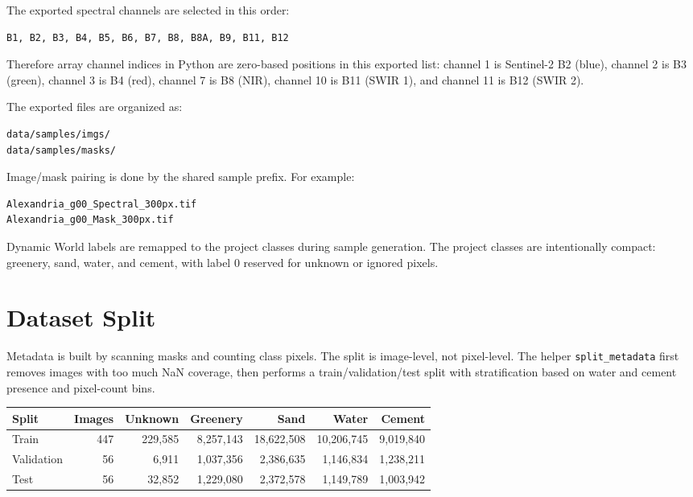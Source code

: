 \documentclass[11pt,a4paper]{article}
\begin{document}
The exported spectral channels are selected in this order:
\begin{verbatim}
B1, B2, B3, B4, B5, B6, B7, B8, B8A, B9, B11, B12
\end{verbatim}
Therefore array channel indices in Python are zero-based positions in this exported list: channel 1 is Sentinel-2 B2 (blue), channel 2 is B3 (green), channel 3 is B4 (red), channel 7 is B8 (NIR), channel 10 is B11 (SWIR 1), and channel 11 is B12 (SWIR 2).

The exported files are organized as:
\begin{verbatim}
data/samples/imgs/
data/samples/masks/
\end{verbatim}

Image/mask pairing is done by the shared sample prefix. For example:
\begin{verbatim}
Alexandria_g00_Spectral_300px.tif
Alexandria_g00_Mask_300px.tif
\end{verbatim}

Dynamic World labels are remapped to the project classes during sample generation. The project classes are intentionally compact: greenery, sand, water, and cement, with label 0 reserved for unknown or ignored pixels.

\section{Dataset Split}

Metadata is built by scanning masks and counting class pixels. The split is image-level, not pixel-level. The helper \texttt{split\_metadata} first removes images with too much NaN coverage, then performs a train/validation/test split with stratification based on water and cement presence and pixel-count bins.

\begin{center}
\begin{tabular}{lrrrrrr}
\toprule
Split & Images & Unknown & Greenery & Sand & Water & Cement \\
\midrule
Train & 447 & 229,585 & 8,257,143 & 18,622,508 & 10,206,745 & 9,019,840 \\
Validation & 56 & 6,911 & 1,037,356 & 2,386,635 & 1,146,834 & 1,238,211 \\
Test & 56 & 32,852 & 1,229,080 & 2,372,578 & 1,149,789 & 1,003,942 \\
\bottomrule
\end{tabular}
\end{center}
\end{document}
